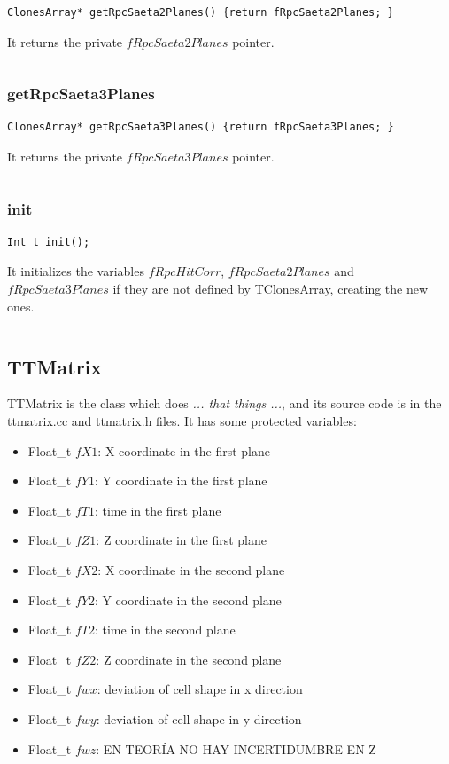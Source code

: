\documentclass[a4paper]{book}
\begin{document}
\begin{lstlisting}[style=customc]
ClonesArray* getRpcSaeta2Planes() {return fRpcSaeta2Planes; }
\end{lstlisting}

It returns the private $fRpcSaeta2Planes$ pointer.

\[\]

\subsubsection{getRpcSaeta3Planes}

\begin{lstlisting}[style=customc]
ClonesArray* getRpcSaeta3Planes() {return fRpcSaeta3Planes; }
\end{lstlisting}

It returns the private $fRpcSaeta3Planes$ pointer.

\[\]

\subsubsection{init}

\begin{lstlisting}[style=customc]
Int_t init();
\end{lstlisting}

It initializes the variables $fRpcHitCorr$, $fRpcSaeta2Planes$ and $fRpcSaeta3Planes$ if they are not defined by TClonesArray, creating the new ones.

\[\]

\subsection{TTMatrix}

TTMatrix is the class which does \textit{... that things ...}, and its source code is in the ttmatrix.cc and ttmatrix.h files. It has some protected variables:

\begin{itemize}
	\item Float\_t $fX1$: X coordinate in the first plane
	\item Float\_t $fY1$: Y coordinate in the first plane
	\item Float\_t $fT1$: time in the first plane
	\item Float\_t $fZ1$: Z coordinate in the first plane
	\item Float\_t $fX2$: X coordinate in the second plane
	\item Float\_t $fY2$: Y coordinate in the second plane
	\item Float\_t $fT2$: time in the second plane
	\item Float\_t $fZ2$: Z coordinate in the second plane
	\item Float\_t $fwx$: deviation of cell shape in x direction
	\item Float\_t $fwy$: deviation of cell shape in y direction
	\item Float\_t $fwz$: EN TEORÍA NO HAY INCERTIDUMBRE EN Z
\end{itemize}
\end{document}
